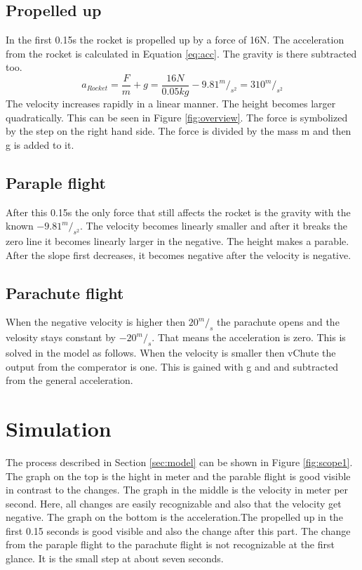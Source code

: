 	

	\subsection{Propelled up}
	In the first 0.15s the rocket is propelled up by a force of 16N. The acceleration from the rocket is calculated in Equation \ref{eq:acc}. The gravity is there subtracted too.
		\begin{equation}
			a_{Rocket} = \frac{F}{m} + g = \frac{16N}{0.05kg} - 9.81^m/_{s^2} = 310^m/_{s^2} \label{eq:acc}
		\end{equation}
	The velocity increases rapidly in a linear manner. The height becomes larger quadratically. This can be seen in Figure \ref{fig:overview}. The force is symbolized by the step on the right hand side. The force is divided by the mass m and then g is added to it.
	
	
	\subsection{Paraple flight}
	After this 0.15s the only force that still affects the rocket is the gravity with the known $-9.81^m/_{s^2}$. 
	The velocity becomes linearly smaller and after it breaks the zero line it becomes linearly larger in the negative. 
	The height makes a parable. After the slope first decreases, it becomes negative after the velocity is negative.
	
	
	\subsection{Parachute flight}
	When the negative velocity is higher then $20^m/_s$ the parachute opens and the velosity stays constant by $-20^m/_s$. That means the acceleration is zero. This is solved in the model as follows. When the velocity is smaller then vChute the output from the comperator is one. This is gained with g and and subtracted from the general acceleration.
	

\newpage
\section{Simulation}
The process described in Section \ref{sec:model} can be shown in Figure \ref{fig:scope1}. 
The graph on the top is the hight in meter and the parable flight is good visible in contrast to the changes. 
The graph in the middle is the velocity in meter per second. Here, all changes are easily recognizable and also that the velocity get negative.
The graph on the bottom is the acceleration.The propelled up in the first 0.15 seconds is good visible and also the change after this part. The change from the paraple flight to the parachute flight is not recognizable at the first glance. It is the small step at about seven seconds.
	
